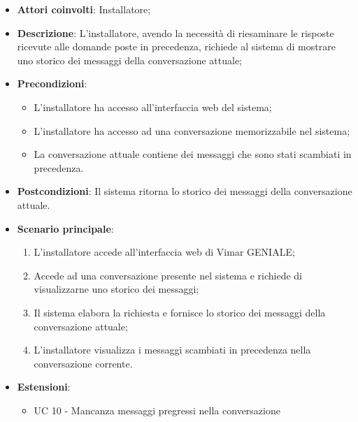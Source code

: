 \begin{itemize}
    \item \textbf{Attori coinvolti}: Installatore;
    \item \textbf{Descrizione}: L’installatore, avendo la necessità di riesaminare le risposte ricevute alle domande poste in precedenza, richiede al sistema di mostrare uno storico dei messaggi della conversazione attuale;
    \item \textbf{Precondizioni}: 
        \begin{itemize}
            \item L’installatore ha accesso all’interfaccia web del sistema;
            \item L’installatore ha accesso ad una conversazione memorizzabile nel sistema;
            \item La conversazione attuale contiene dei messaggi che sono stati scambiati in precedenza.
        \end{itemize}
    \item \textbf{Postcondizioni}: Il sistema ritorna lo storico dei messaggi della conversazione attuale.
    \item \textbf{Scenario principale}:
    \begin{enumerate}
    \item L’installatore accede all’interfaccia web di Vimar GENIALE;
    \item Accede ad una conversazione presente nel sistema e richiede di visualizzarne uno storico dei messaggi;
    \item Il sistema elabora la richiesta e fornisce lo storico dei messaggi della conversazione attuale;
    \item L’installatore visualizza i messaggi scambiati in precedenza nella conversazione corrente.
    \end{enumerate}
    \item \textbf{Estensioni}: 
        \begin{itemize}
            \item UC 10 - Mancanza messaggi pregressi nella conversazione
        \end{itemize}
\end{itemize}
